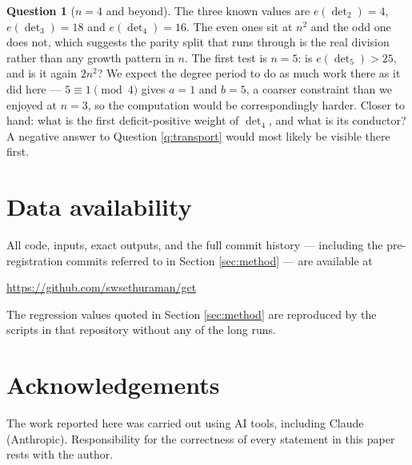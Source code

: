 \documentclass[11pt,reqno]{amsart}
\theoremstyle{plain}
\theoremstyle{definition}
\newtheorem{question}[theorem]{Question}
\begin{document}
\begin{question}[$n=4$ and beyond]\label{q:n4}
The three known values are $e(\det_2)=4$, $e(\det_3)=18$ and $e(\det_4)=16$.
The even ones sit at $n^{2}$ and the odd one does not, which suggests the
parity split that runs through \cite{BI} is the real division rather than any
growth pattern in $n$.  The first test is $n=5$: is $e(\det_5)>25$, and is it
again $2n^{2}$?  We expect the degree period to do as much work there as it did
here --- $5\equiv1\pmod4$ gives $a=1$ and $b=5$, a coarser constraint than we
enjoyed at $n=3$, so the computation would be correspondingly harder.  Closer
to hand: what is the first deficit-positive weight of $\det_4$, and what is its
conductor?  A negative answer to Question \ref{q:transport} would most likely
be visible there first.
\end{question}

\section*{Data availability}

All code, inputs, exact outputs, and the full commit history --- including the
pre-registration commits referred to in Section \ref{sec:method} --- are
available at
\begin{center}
  \url{https://github.com/swsethuraman/gct}
\end{center}
The regression values quoted in Section \ref{sec:method} are reproduced by the
scripts in that repository without any of the long runs.

\section*{Acknowledgements}

The work reported here was carried out using AI tools, including Claude (Anthropic).
Responsibility for the correctness of every statement in this paper rests with
the author.
\end{document}
